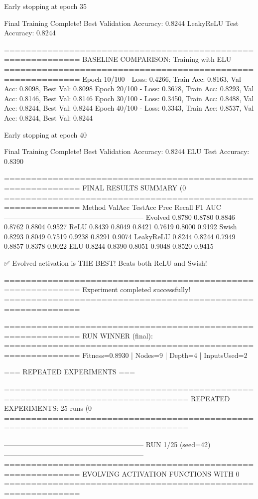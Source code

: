 Early stopping at epoch 35

Final Training Complete!
Best Validation Accuracy: 0.8244
LeakyReLU Test Accuracy: 0.8244

============================================================
BASELINE COMPARISON: Training with ELU
============================================================
Epoch  10/100 - Loss: 0.4266, Train Acc: 0.8163, Val Acc: 0.8098, Best Val: 0.8098
Epoch  20/100 - Loss: 0.3678, Train Acc: 0.8293, Val Acc: 0.8146, Best Val: 0.8146
Epoch  30/100 - Loss: 0.3450, Train Acc: 0.8488, Val Acc: 0.8244, Best Val: 0.8244
Epoch  40/100 - Loss: 0.3343, Train Acc: 0.8537, Val Acc: 0.8244, Best Val: 0.8244

Early stopping at epoch 40

Final Training Complete!
Best Validation Accuracy: 0.8244
ELU Test Accuracy: 0.8390

============================================================
FINAL RESULTS SUMMARY (0%
============================================================
Method             ValAcc     TestAcc    Prec       Recall     F1         AUC
------------------------------------------------------------
Evolved            0.8780     0.8780     0.8846     0.8762     0.8804     0.9527
ReLU               0.8439     0.8049     0.8421     0.7619     0.8000     0.9192
Swish              0.8293     0.8049     0.7519     0.9238     0.8291     0.9074
LeakyReLU          0.8244     0.8244     0.7949     0.8857     0.8378     0.9022
ELU                0.8244     0.8390     0.8051     0.9048     0.8520     0.9415

✅ Evolved activation is THE BEST! Beats both ReLU and Swish!

============================================================
Experiment completed successfully!
============================================================

============================================================
RUN WINNER (final):
============================================================
Fitness=0.8930 | Nodes=9 | Depth=4 | InputsUsed=2

=== REPEATED EXPERIMENTS ===


================================================================================
REPEATED EXPERIMENTS: 25 runs (0%
================================================================================

------------------------------------------------------------
RUN 1/25 (seed=42)
------------------------------------------------------------
============================================================
EVOLVING ACTIVATION FUNCTIONS
WITH 0%
============================================================

